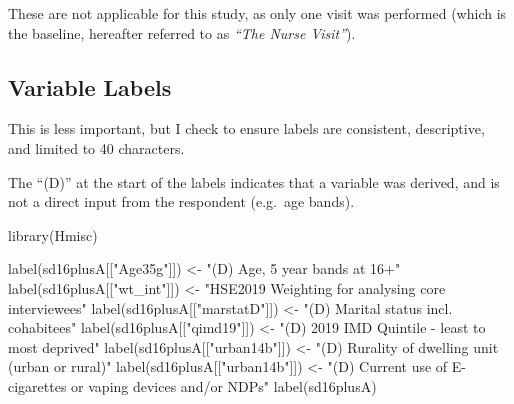 \documentclass[
  11pt,
]{article}
\newenvironment{Shaded}{\begin{snugshade}}{\end{snugshade}}
\newcommand{\FunctionTok}[1]{\textcolor[rgb]{0.00,0.00,0.00}{#1}}
\newcommand{\NormalTok}[1]{#1}
\newcommand{\OtherTok}[1]{\textcolor[rgb]{0.56,0.35,0.01}{#1}}
\newcommand{\StringTok}[1]{\textcolor[rgb]{0.31,0.60,0.02}{#1}}
\begin{document}
These are not applicable for this study, as only one visit was performed
(which is the baseline, hereafter referred to as \emph{``The Nurse
Visit''}).

\hypertarget{variable-labels}{%
\subsection{Variable Labels}\label{variable-labels}}

This is less important, but I check to ensure labels are consistent,
descriptive, and limited to 40 characters.

The ``(D)'' at the start of the labels indicates that a variable was
derived, and is not a direct input from the respondent (e.g.~age bands).

\begin{Shaded}
\begin{Highlighting}[]
\FunctionTok{library}\NormalTok{(Hmisc)}

\FunctionTok{label}\NormalTok{(sd16plusA[[}\StringTok{"Age35g"}\NormalTok{]]) }\OtherTok{\textless{}{-}} \StringTok{"(D) Age, 5 year bands at 16+"}
\FunctionTok{label}\NormalTok{(sd16plusA[[}\StringTok{"wt\_int"}\NormalTok{]]) }\OtherTok{\textless{}{-}} \StringTok{"HSE2019 Weighting for analysing core interviewees"}
\FunctionTok{label}\NormalTok{(sd16plusA[[}\StringTok{"marstatD"}\NormalTok{]]) }\OtherTok{\textless{}{-}} \StringTok{"(D) Marital status incl. cohabitees"}
\FunctionTok{label}\NormalTok{(sd16plusA[[}\StringTok{"qimd19"}\NormalTok{]]) }\OtherTok{\textless{}{-}} \StringTok{"(D) 2019 IMD Quintile {-} least to most deprived"}
\FunctionTok{label}\NormalTok{(sd16plusA[[}\StringTok{"urban14b"}\NormalTok{]]) }\OtherTok{\textless{}{-}} \StringTok{"(D) Rurality of dwelling unit (urban or rural)"}
\FunctionTok{label}\NormalTok{(sd16plusA[[}\StringTok{"urban14b"}\NormalTok{]]) }\OtherTok{\textless{}{-}} \StringTok{"(D) Current use of E{-}cigarettes or vaping devices and/or NDPs"}
\FunctionTok{label}\NormalTok{(sd16plusA)}
\end{Highlighting}
\end{Shaded}
\end{document}
